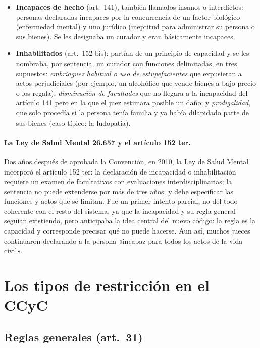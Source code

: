 \documentclass[12pt,oneside]{book}
\begin{document}
\begin{itemize}
\item \textbf{Incapaces de hecho} (art.~141), también llamados insanos o interdictos: personas declaradas incapaces por la concurrencia de un factor biológico (enfermedad mental) y uno jurídico (ineptitud para administrar su persona o sus bienes). Se les designaba un curador y eran básicamente incapaces.
\item \textbf{Inhabilitados} (art.~152 bis): partían de un principio de capacidad y se les nombraba, por sentencia, un curador con funciones delimitadas, en tres supuestos: \textit{embriaguez habitual o uso de estupefacientes} que expusieran a actos perjudiciales (por ejemplo, un alcohólico que vende bienes a bajo precio o los regala); \textit{disminución de facultades} que no llegara a la incapacidad del artículo 141 pero en la que el juez estimara posible un daño; y \textit{prodigalidad}, que solo procedía si la persona tenía familia y ya había dilapidado parte de sus bienes (caso típico: la ludopatía).
\end{itemize}

\paragraph{La Ley de Salud Mental 26.657 y el artículo 152 ter.} Dos años después de aprobada la Convención, en 2010, la Ley de Salud Mental incorporó el artículo 152 ter: la declaración de incapacidad o inhabilitación requiere un examen de facultativos con evaluaciones interdisciplinarias; la sentencia no puede extenderse por más de tres años; y debe especificar las funciones y actos que se limitan. Fue un primer intento parcial, no del todo coherente con el resto del sistema, ya que la incapacidad y su regla general seguían existiendo, pero anticipaba la idea central del nuevo código: la regla es la capacidad y corresponde precisar qué no puede hacerse. Aun así, muchos jueces continuaron declarando a la persona «incapaz para todos los actos de la vida civil».

\section{Los tipos de restricción en el CCyC}

\subsection{Reglas generales (art.~31)}
\end{document}
